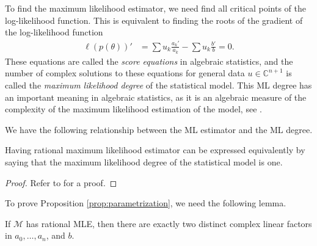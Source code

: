 To find the maximum likelihood estimator, we need find all critical points of the log-likelihood function. This is equivalent to finding the roots of the gradient of the log-likelihood function
\begin{align}\label{eq:score-equations}
    \ell(p(\theta))' &= \sum u_k \frac{a_k'}{a_k} - \sum u_k \frac{b'}{b} = 0.
\end{align}
These equations are called the \emph{score equations} in algebraic statistics, and the number of complex solutions to these equations for general data \( u \in \mathbb{C}^{n + 1} \) is called the \emph{maximum likelihood degree} of the statistical model. This ML degree has an important meaning in algebraic statistics, as it is an algebraic measure of the complexity of the maximum likelihood estimation of the model, see \cite{amendola2019maximum, catanese2006maximum, sullivant2023algebraic}.

We have the following relationship between the ML estimator and the ML degree.

\begin{proposition}\label{prop:rational-mle}
    Having rational maximum likelihood estimator can be expressed equivalently by saying that the maximum likelihood degree of the statistical model is one.
\end{proposition}

\begin{proof}
   Refer to \cite{duarte2021discrete} for a proof.
\end{proof}

To prove Proposition \ref{prop:parametrization}, we need the following lemma.

\begin{lemma}\label{lem:two-complex-factors}
    If \( \mathcal{M} \) has rational MLE, then there are exactly two distinct complex linear factors in \( a_0, \dots, a_n \), and \( b \).
\end{lemma}

